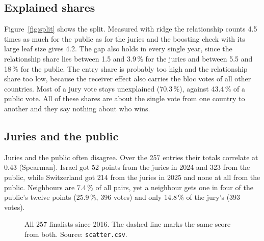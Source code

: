 \documentclass[a4paper,10pt]{article}
\begin{document}
\subsection{Explained shares}

Figure~\ref{fig:split} shows the split.
Measured with ridge the relationship counts 4.5 times as much for the public as for the juries and the boosting check with its large leaf size gives 4.2.
The gap also holds in every single year, since the relationship share lies between 1.5 and 3.9\,\% for the juries and between 5.5 and 18\,\% for the public.
The entry share is probably too high and the relationship share too low, because the receiver effect also carries the bloc votes of all other countries.
Most of a jury vote stays unexplained (70.3\,\%), against 43.4\,\% of a public vote.
All of these shares are about the single vote from one country to another and they say nothing about who wins.

\subsection{Juries and the public}

Juries and the public often disagree.
Over the 257 entries their totals correlate at 0.43 (Spearman).
Israel got 52 points from the juries in 2024 and 323 from the public, while Switzerland got 214 from the juries in 2025 and none at all from the public.
Neighbours are 7.4\,\% of all pairs, yet a neighbour gets one in four of the public's twelve points (25.9\,\%, 396 votes) and only 14.8\,\% of the jury's (393 votes).

\begin{figure}[t]
\centering
{}
\caption{All 257 finalists since 2016. The dashed line marks the same score from both. Source: \texttt{scatter.csv}.}
\label{fig:scatter}
\end{figure}
\end{document}
